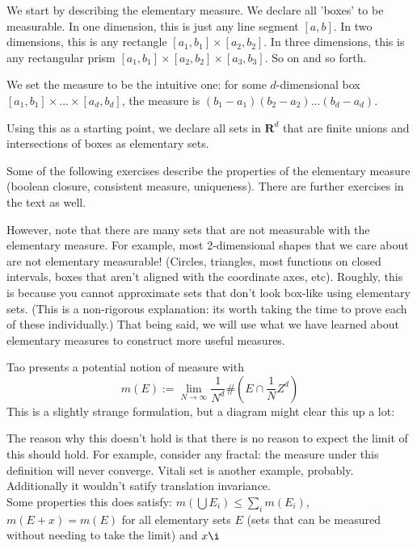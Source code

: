 \documentclass[answers,12pt]{exam}
\begin{document}
We start by describing the elementary measure.
We declare all 'boxes' to be measurable.
In one dimension, this is just any line segment $[a,b]$.
In two dimensions, this is any rectangle $[a_1,b_1] \times [a_2, b_2]$.
In three dimensions, this is any rectangular prism $[a_1,b_1] \times [a_2, b_2] \times [a_3,b_3]$.
So on and so forth.

We set the measure to be the intuitive one: for some $d$-dimensional box $[a_1,b_1] \times ... \times [a_d,b_d]$, the measure is $(b_1-a_1)(b_2-a_2)...(b_d-a_d)$.

Using this as a starting point, we declare all sets in $\mathbf{R}^d$ that are finite unions and intersections of boxes as elementary sets.

Some of the following exercises describe the properties of the elementary measure (boolean closure, consistent measure, uniqueness).
There are further exercises in the text as well.

However, note that there are many sets that are not measurable with the elementary measure.
For example, most 2-dimensional shapes that we care about are not elementary measurable!
(Circles, triangles, most functions on closed intervals, boxes that aren't aligned with the coordinate axes, etc).
Roughly, this is because you cannot approximate sets that don't look box-like using elementary sets.
(This is a non-rigorous explanation: its worth taking the time to prove each of these individually.)
That being said, we will use what we have learned about elementary measures to construct more useful measures.

Tao presents a potential notion of measure with 
\begin{equation}
m(E) := \lim_{N \rightarrow \infty}\frac{1}{N^d}\#(E\cap \frac{1}{N}Z^d)    
\end{equation}
This is a slightly strange formulation, but a diagram might clear this up a lot:


The reason why this doesn't hold is that there is no reason to expect the limit of this should hold.
For example, consider any fractal: the measure under this definition will never converge. 
Vitali set is another example, probably.
Additionally it wouldn't satify translation invariance.\\
Some properties this does satisfy: $m(\bigcup E_i) \leq \sum_i m(E_i)$, $m(E+x) = m(E)$ for all elementary sets $E$ (sets that can be measured without needing to take the limit) and $x\i$
\end{document}
